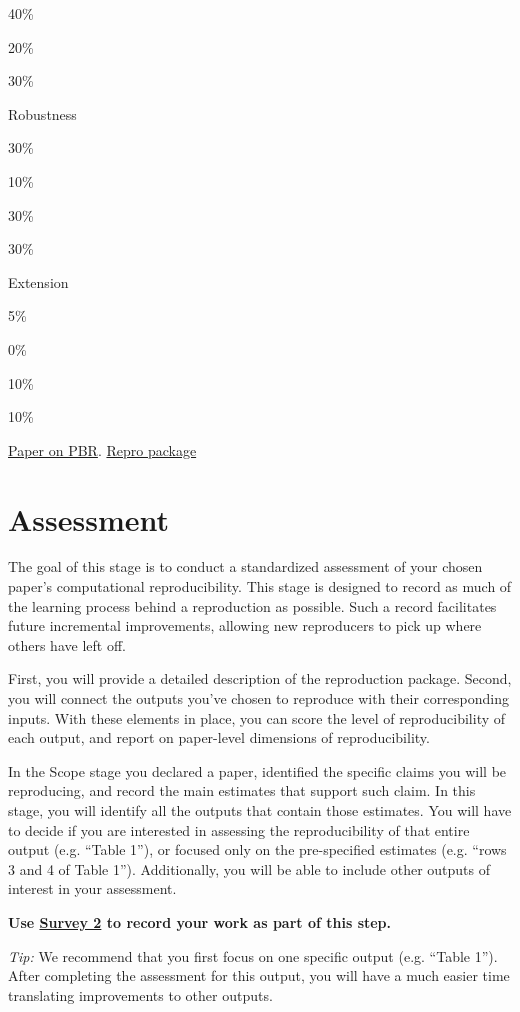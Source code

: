 \documentclass[]{book}
\begin{document}
40\%

20\%

30\%

Robustness

30\%

10\%

30\%

30\%

Extension

5\%

0\%

10\%

10\%

\href{https://osf.io/4jvq2/download}{Paper on PBR}. \href{https://dataverse.harvard.edu/dataset.xhtml?persistentId=doi:10.7910/DVN/FPNITS}{Repro package}

\hypertarget{assessment}{%
\chapter{Assessment}\label{assessment}}

The goal of this stage is to conduct a standardized assessment of your chosen paper's computational reproducibility. This stage is designed to record as much of the learning process behind a reproduction as possible. Such a record facilitates future incremental improvements, allowing new reproducers to pick up where others have left off.

First, you will provide a detailed description of the reproduction package. Second, you will connect the outputs you've chosen to reproduce with their corresponding inputs. With these elements in place, you can score the level of reproducibility of each output, and report on paper-level dimensions of reproducibility.

In the Scope stage you declared a paper, identified the specific claims you will be reproducing, and record the main estimates that support such claim. In this stage, you will identify all the outputs that contain those estimates. You will have to decide if you are interested in assessing the reproducibility of that entire output (e.g. ``Table 1''), or focused only on the pre-specified estimates (e.g. ``rows 3 and 4 of Table 1''). Additionally, you will be able to include other outputs of interest in your assessment.

\textbf{Use \href{https://berkeley.qualtrics.com/jfe/form/SV_2gd9Y3XVtjLpZL7}{Survey 2} to record your work as part of this step.}

\emph{Tip:} We recommend that you first focus on one specific output (e.g. ``Table 1''). After completing the assessment for this output, you will have a much easier time translating improvements to other outputs.
\end{document}
